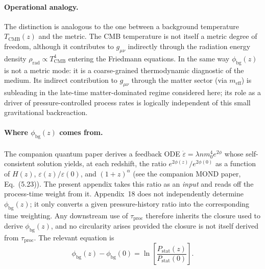 \documentclass[11pt]{article}
\begin{document}
\paragraph{Operational analogy.}
The distinction is analogous to the one between a background temperature
$T_{\mathrm{CMB}}(z)$ and the metric.  The CMB temperature is not itself a
metric degree of freedom, although it contributes to $g_{\mu\nu}$
indirectly through the radiation energy density
$\rho_{\mathrm{rad}}\propto T_{\mathrm{CMB}}^{4}$ entering the Friedmann
equations.  In the same way $\phi_{\mathrm{bg}}(z)$ is not a metric mode:
it is a coarse-grained thermodynamic diagnostic of the medium.  Its
indirect contribution to $g_{\mu\nu}$ through the matter sector (via
$m_{\mathrm{eff}}$) is subleading in the late-time matter-dominated regime
considered here; its role as a driver of pressure-controlled process rates is
logically independent of this small gravitational backreaction.

\paragraph{Where $\phi_{\mathrm{bg}}(z)$ comes from.}
The companion quantum paper derives a feedback ODE
$\dot\varepsilon=\lambda n m_0^4 e^{2\phi}$ whose self-consistent
solution yields, at each redshift, the ratio $e^{2\phi(z)}/e^{2\phi(0)}$
as a function of $H(z)$, $\varepsilon(z)/\varepsilon(0)$, and
$(1+z)^\alpha$ (see the companion MOND paper, Eq.~(5.23)).
The present appendix takes this ratio as an \emph{input} and reads off
the process-time weight from it.  Appendix~18 does not independently
determine $\phi_{\mathrm{bg}}(z)$; it only converts a given
pressure-history ratio into the corresponding time weighting.  Any
downstream use of $\tau_{\mathrm{proc}}$ therefore inherits the
closure used to derive $\phi_{\mathrm{bg}}(z)$, and no circularity
arises provided the closure is not itself derived from
$\tau_{\mathrm{proc}}$.  The relevant equation is
\begin{equation}
  \phi_{\mathrm{bg}}(z)-\phi_{\mathrm{bg}}(0)
  = \ln\!\left[\frac{P_{\mathrm{stat}}(z)}{P_{\mathrm{stat}}(0)}\right].
  \label{eq:phibg_app18}
\end{equation}
\end{document}
